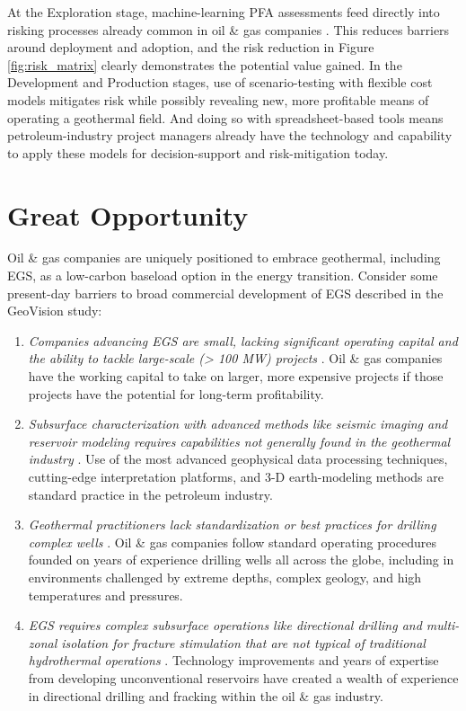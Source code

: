 At the Exploration stage, machine-learning PFA assessments feed directly into risking processes already common in oil \& gas companies \citep{nash_adaptation_2015}. This reduces barriers around deployment and adoption, and the risk reduction in Figure \ref{fig:risk_matrix} clearly demonstrates the potential value gained. In the Development and Production stages, use of scenario-testing with flexible cost models mitigates risk while possibly revealing new, more profitable means of operating a geothermal field. And doing so with spreadsheet-based tools means petroleum-industry project managers already have the technology and capability to apply these models for decision-support and risk-mitigation today. 

\section{Great Opportunity}\label{ch7:opportunity}

Oil \& gas companies are uniquely positioned to embrace geothermal, including EGS, as a low-carbon baseload option in the energy transition. Consider some present-day barriers to broad commercial development of EGS described in the GeoVision study: 
\begin{enumerate}
    \item \textit{Companies advancing EGS are small, lacking significant operating capital and the ability to tackle large-scale (> 100 MW) projects} \citep{doughty_geovision_2018}. Oil \& gas companies have the working capital to take on larger, more expensive projects if those projects have the potential for long-term profitability.
    \item \textit{Subsurface characterization with advanced methods like seismic imaging and reservoir modeling requires capabilities not generally found in the geothermal industry} \citep{doughty_geovision_2018}. Use of the most advanced geophysical data processing techniques, cutting-edge interpretation platforms, and 3-D earth-modeling methods are standard practice in the petroleum industry.
    \item \textit{Geothermal practitioners lack standardization or best practices for drilling complex wells} \citep{doughty_geovision_2018}. Oil \& gas companies follow standard operating procedures founded on years of experience drilling wells all across the globe, including in environments challenged by extreme depths, complex geology, and high temperatures and pressures.
    \item \textit{EGS requires complex subsurface operations like directional drilling and multi-zonal isolation for fracture stimulation that are not typical of traditional hydrothermal operations} \citep{augustine_geovision_2019}. Technology improvements and years of expertise from developing unconventional reservoirs have created a wealth of experience in directional drilling and fracking within the oil \& gas industry.
\end{enumerate}

